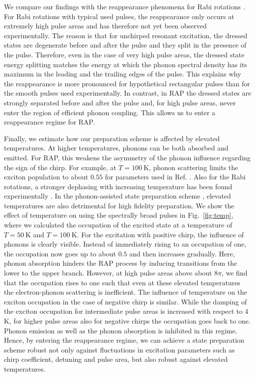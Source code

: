 \documentclass[aps,prl,reprint,superscriptaddress]{revtex4-1}
\begin{document}
We compare our findings with the reappearance phenomena for Rabi rotations \cite{vagov2007non}. For Rabi rotations with typical used pulses, the reappearance only occurs at extremely high pulse areas and has therefore not yet been observed experimentally.
The reason is that for unchirped resonant excitation, the dressed states are degenerate before and after the pulse and they split in the presence of the pulse. Therefore, even in the case of very high pulse areas, the dressed state energy splitting matches the energy at which the phonon spectral density has its maximum in the leading and the trailing edges of the pulse. This explains why the reappearance is more pronounced for hypothetical rectangular pulses \cite{Glassl2011} than for the smooth pulses used experimentally. In contrast, in RAP the dressed states are strongly separated before and after the pulse and, for high pulse areas, never enter the region of efficient phonon coupling. This allows us to enter a
reappearance regime for RAP.

Finally, we estimate how our preparation scheme is affected by elevated temperatures. At higher temperatures, phonons can be both absorbed and emitted. For RAP, this weakens the asymmetry of the phonon influence regarding the sign of the chirp. For example, at $T=\SI{100}{\kelvin}$, phonon scattering limits the exciton population to about $0.55$ for parameters used in Ref. \cite{Luker2012}. Also for the Rabi rotations, a stronger dephasing with increasing temperature has been found experimentally \cite{Ramsay2010}. In the phonon-assisted state preparation scheme \cite{Quilter2015pho}, elevated temperatures are also detrimental for high fidelity preparation. We show the effect of temperature on using the spectrally broad pulses in Fig.~\ref{fig:temp}, where we calculated the occupation of the excited state at a temperature of $T=\SI{50}{\kelvin}$ and $T=\SI{100}{\kelvin}$. For the excitation with positive chirp, the influence of phonons is clearly visible. Instead of immediately rising to an occupation of one, the occupation now goes up to about $0.5$ and then increases gradually. Here, phonon absorption hinders the RAP process by inducing transitions from the lower to the upper branch. However, at high pulse areas above about $8\pi$, we find that the occupation rises to one such that even at these elevated temperatures the electron-phonon scattering is inefficient. The influence of temperature on the exciton occupation in the case of negative chirp is similar. While the damping of the exciton occupation for intermediate pulse areas is increased with respect to 4 K, for higher pulse areas also for negative chirps the occupation goes back to one. Phonon emission as well as the phonon absorption is inhibited in this regime. Hence, by entering the reappearance regime, we can achieve a state preparation scheme robust not only against fluctuations in excitation parameters such as chirp coefficient, detuning and pulse area, but also robust against elevated temperatures.
\end{document}
